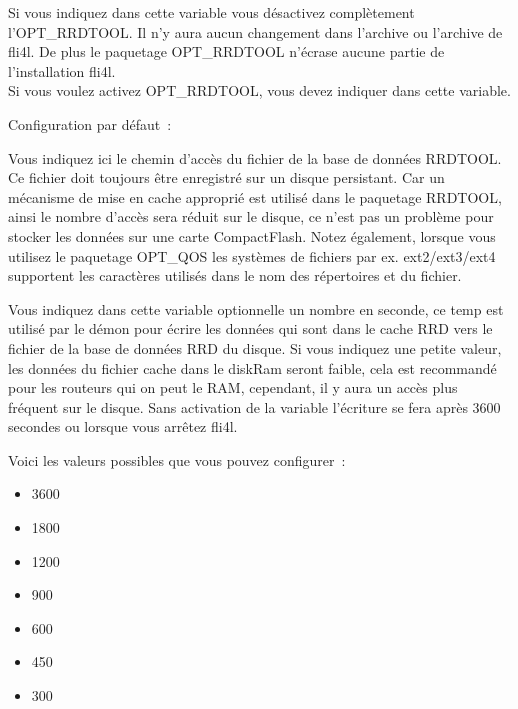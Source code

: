 \begin{description}


  Si vous indiquez  dans cette variable vous désactivez
  complètement l'OPT\_RRDTOOL. Il n'y aura aucun changement dans l'archive
   ou l'archive  de fli4l. De plus le paquetage
  OPT\_RRDTOOL n'écrase aucune partie de l'installation fli4l.\\
  Si vous voulez activez OPT\_RRDTOOL, vous devez indiquer  dans
  cette variable.


  Configuration par défaut~: 

  Vous indiquez ici le chemin d'accès du fichier de la base de données RRDTOOL.
  Ce fichier doit toujours être enregistré sur un disque persistant. Car
  un mécanisme de mise en cache approprié est utilisé dans le paquetage RRDTOOL,
  ainsi le nombre d'accès sera réduit sur le disque, ce n'est pas un problème
  pour stocker les données sur une carte CompactFlash. Notez également, lorsque vous
  utilisez le paquetage OPT\_QOS les systèmes de fichiers par ex. ext2/ext3/ext4
  supportent les caractères utilisés dans le nom des répertoires et du fichier.


  Vous indiquez dans cette variable optionnelle un nombre en seconde, ce temp est
  utilisé par le démon pour écrire les données qui sont dans le cache RRD vers le
  fichier de la base de données RRD du disque. Si vous indiquez une petite valeur,
  les données du fichier cache dans le diskRam seront faible, cela est recommandé
  pour les routeurs qui on peut le RAM, cependant, il y aura un accès plus fréquent
  sur le disque. Sans activation de la variable l'écriture se fera après 3600 secondes
  ou lorsque vous arrêtez fli4l.

  Voici les valeurs possibles que vous pouvez configurer~:
  \begin{itemize}
    \item 3600
    \item 1800
    \item 1200
    \item 900
    \item 600
    \item 450
    \item 300
  \end{itemize}


\end{description}
